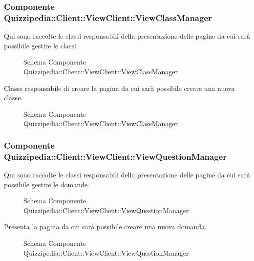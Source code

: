 \subsubsection{Componente Quizzipedia::Client::ViewClient::ViewClassManager}
Qui sono raccolte le classi responsabili della presentazione delle pagine da cui sarà possibile gestire le classi.
\begin{figure}[H]
\centering
\noindent{}
\caption{Schema Componente Quizzipedia::Client::ViewClient::ViewClassManager}
\end{figure}
Classe responsabile di creare la pagina da cui sarà possibile creare una nuova classe.
\begin{figure}[H]
\centering
\noindent{}
\caption{Schema Componente Quizzipedia::Client::ViewClient::ViewClassManager}
\end{figure}
\subsubsection{Componente Quizzipedia::Client::ViewClient::ViewQuestionManager}
Qui sono raccolte le classi responsabili della presentazione delle pagine da cui sarà possibile gestire le domande.
\begin{figure}[H]
\centering
\noindent{}
\caption{Schema Componente Quizzipedia::Client::ViewClient::ViewQuestionManager}
\end{figure}
Presenta la pagina da cui sarà possibile creare una nuova domanda.
\begin{figure}[H]
\centering
\noindent{}
\caption{Schema Componente Quizzipedia::Client::ViewClient::ViewQuestionManager}
\end{figure}
